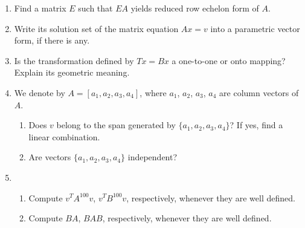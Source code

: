 \documentclass[11pt]{amsart}
\begin{document}
\begin{enumerate}
\item Find a matrix $E$ such that $EA$ yields reduced row echelon form of $A$.
\vspace{.5in}
\vspace{.5in}
\vspace{.5in}
\vspace{.5in}


\item Write its solution set of the matrix equation $Ax = v$ into a parametric vector form, if there is any.
\vspace{.5in}
\vspace{.5in}
\vspace{.5in}
\vspace{.5in}


\item  %
Is the transformation defined by $Tx = Bx$
a one-to-one or onto mapping? Explain its geometric meaning.

\vspace{.5in}
\vspace{.5in}
\vspace{.5in}
\vspace{.5in}



\item We denote by $A = [a_1, a_2, a_3, a_4]$, where $a_1$, $a_2$, $a_3$, $a_4$ are column vectors of $A$.
\begin{enumerate}
\item Does  $v$ belong to the span generated by $\{a_1, a_2, a_3, a_4\}$? If yes, find a linear combination.
\vspace{.5in}
\vspace{.5in}
  \item
Are vectors $\{a_1, a_2, a_3, a_4\}$ independent?
\vspace{.5in}
\vspace{.5in}
\vspace{.5in}
\end{enumerate}



\item
\begin{enumerate}
\item Compute $v^TA^{100}v$, $v^TB^{100}v$, respectively, whenever they are well defined.
\vspace{.5in}
\vspace{.5in}
\vspace{.5in}
\item
Compute $BA$, $BAB$, respectively, whenever they are well defined.
\vspace{.5in}
\vspace{.5in}
\vspace{.5in}

\end{enumerate}




\end{enumerate}
\end{document}
